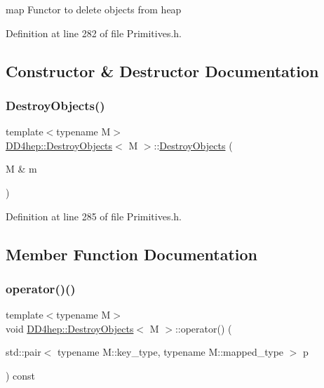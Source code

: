 map Functor to delete objects from heap 

Definition at line 282 of file Primitives.\+h.



\subsection{Constructor \& Destructor Documentation}
\hypertarget{class_d_d4hep_1_1_destroy_objects_afa755ee063407e0d37a4906a3a17f855}{}\label{class_d_d4hep_1_1_destroy_objects_afa755ee063407e0d37a4906a3a17f855} 
\subsubsection{\texorpdfstring{Destroy\+Objects()}{DestroyObjects()}}
{\footnotesize\ttfamily template$<$typename M$>$ \\
\hyperlink{class_d_d4hep_1_1_destroy_objects}{D\+D4hep\+::\+Destroy\+Objects}$<$ M $>$\+::\hyperlink{class_d_d4hep_1_1_destroy_objects}{Destroy\+Objects} (\begin{DoxyParamCaption}\item[{M \&}]{m }\end{DoxyParamCaption})\hspace{0.3cm}{\ttfamily [inline]}}



Definition at line 285 of file Primitives.\+h.



\subsection{Member Function Documentation}
\hypertarget{class_d_d4hep_1_1_destroy_objects_ac5430a41ccfe1e8a063cf12175f169ab}{}\label{class_d_d4hep_1_1_destroy_objects_ac5430a41ccfe1e8a063cf12175f169ab} 
\subsubsection{\texorpdfstring{operator()()}{operator()()}\hspace{0.1cm}{\footnotesize\ttfamily [1/2]}}
{\footnotesize\ttfamily template$<$typename M$>$ \\
void \hyperlink{class_d_d4hep_1_1_destroy_objects}{D\+D4hep\+::\+Destroy\+Objects}$<$ M $>$\+::operator() (\begin{DoxyParamCaption}\item[{std\+::pair$<$ typename M\+::key\+\_\+type, typename M\+::mapped\+\_\+type $>$}]{p }\end{DoxyParamCaption}) const\hspace{0.3cm}{\ttfamily [inline]}}



